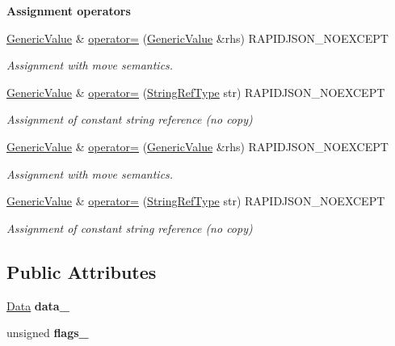 \begin{Indent}\textbf{ Assignment operators}\par
\begin{DoxyCompactItemize}
\item 
\hyperlink{classGenericValue}{Generic\+Value} \& \hyperlink{classGenericValue_a9018a40d7c52efc00daf803c51d3236c}{operator=} (\hyperlink{classGenericValue}{Generic\+Value} \&rhs) R\+A\+P\+I\+D\+J\+S\+O\+N\+\_\+\+N\+O\+E\+X\+C\+E\+PT
\begin{DoxyCompactList}\small\item\em Assignment with move semantics. \end{DoxyCompactList}\item 
\hyperlink{classGenericValue}{Generic\+Value} \& \hyperlink{classGenericValue_a386708557555e6389184de608af5e6a6}{operator=} (\hyperlink{classGenericValue_a32e0f30ee278072374c8168b14d3317f}{String\+Ref\+Type} str) R\+A\+P\+I\+D\+J\+S\+O\+N\+\_\+\+N\+O\+E\+X\+C\+E\+PT
\begin{DoxyCompactList}\small\item\em Assignment of constant string reference (no copy) \end{DoxyCompactList}\item 
\hyperlink{classGenericValue}{Generic\+Value} \& \hyperlink{classGenericValue_a9018a40d7c52efc00daf803c51d3236c}{operator=} (\hyperlink{classGenericValue}{Generic\+Value} \&rhs) R\+A\+P\+I\+D\+J\+S\+O\+N\+\_\+\+N\+O\+E\+X\+C\+E\+PT
\begin{DoxyCompactList}\small\item\em Assignment with move semantics. \end{DoxyCompactList}\item 
\hyperlink{classGenericValue}{Generic\+Value} \& \hyperlink{classGenericValue_a386708557555e6389184de608af5e6a6}{operator=} (\hyperlink{classGenericValue_a32e0f30ee278072374c8168b14d3317f}{String\+Ref\+Type} str) R\+A\+P\+I\+D\+J\+S\+O\+N\+\_\+\+N\+O\+E\+X\+C\+E\+PT
\begin{DoxyCompactList}\small\item\em Assignment of constant string reference (no copy) \end{DoxyCompactList}\end{DoxyCompactItemize}
\end{Indent}
\subsection*{Public Attributes}
\begin{DoxyCompactItemize}
\item 
\mbox{\label{classGenericValue_aaf80f2c91d26fdde60b9edeeecd3509f}} 
\hyperlink{unionGenericValue_1_1Data}{Data} {\bfseries data\+\_\+}
\item 
\mbox{\label{classGenericValue_ad0f9ce0bc0d1714678a77a2295da420c}} 
unsigned {\bfseries flags\+\_\+}
\end{DoxyCompactItemize}
